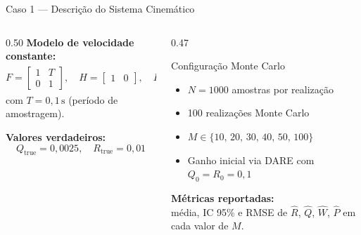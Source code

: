 \documentclass[aspectratio=169]{beamer}
\begin{document}
\begin{frame}{Caso 1 — Descrição do Sistema Cinemático}
    \begin{columns}[T]
        \begin{column}{0.50\textwidth}
            \textbf{Modelo de velocidade constante:}
            \[
                F = \begin{bmatrix} 1 & T \\ 0 & 1 \end{bmatrix},\quad
                H = \begin{bmatrix} 1 & 0 \end{bmatrix},\quad
                \Gamma = \begin{bmatrix} T^2/2 \\ T \end{bmatrix}
            \]
            com $T = 0{,}1\,\text{s}$ (período de amostragem).

            \vspace{0.2cm}
            \textbf{Valores verdadeiros:}
            \[
                Q_{\text{true}} = 0{,}0025, \quad R_{\text{true}} = 0{,}01
            \]
        \end{column}
        \begin{column}{0.47\textwidth}
            \begin{block}{Configuração Monte Carlo}
                \begin{itemize}
                    \item $N = 1000$ amostras por realização
                    \item 100 realizações Monte Carlo
                    \item $M \in \{10,\,20,\,30,\,40,\,50,\,100\}$
                    \item Ganho inicial via DARE com $Q_0 = R_0 = 0{,}1$
                \end{itemize}
            \end{block}
            \vspace{0.2cm}
            \textbf{Métricas reportadas:}\\
            média, IC 95\% e RMSE de
            $\hat{R}$, $\hat{Q}$, $\hat{W}$, $\hat{P}$ em cada valor de $M$.
        \end{column}
    \end{columns}
\end{frame}
\end{document}
